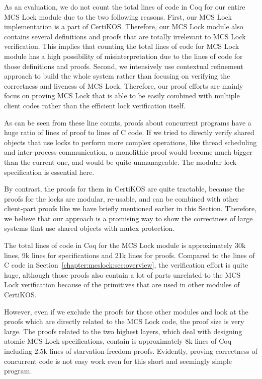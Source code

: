 As an evaluation, we do not count the total lines of code in Coq for our entire 
MCS Lock module due to the two following reasons. First, our MCS Lock implementation 
is a part of CertiKOS. Therefore, our MCS Lock module also contains several definitions 
and proofs that are totally irrelevant to MCS Lock verification. 
This implies that counting the total lines of code for MCS Lock module has a 
high possibility of misinterpretation due to the lines of code for those definitions and proofs.
Second, we intensively use contextual refinement approach to 
build the whole system rather than focusing on verifying the correctness and 
liveness of MCS Lock. Therefore, our proof efforts are mainly focus on proving 
MCS Lock that is able to be easily combined with multiple client codes 
rather than the efficient lock verification itself.  

As can be seen from these line counts, proofs about concurrent programs
have a huge ratio of lines of proof to lines of C code.
If we tried to directly verify shared objects that use locks to 
perform more complex operations, like thread scheduling
and inter-process communication, a monolithic proof  
would become much bigger than the current one, and would be quite
unmanageable. The modular lock specification is essential here.


By contrast, the proofs for them in CertiKOS are quite tractable, 
because the proofs for the locks are modular, re-usable, and can 
be combined with other client-part proofs like we have briefly 
mentioned earlier in this Section.
Therefore, we believe that our approach is a promising way to 
show the correctness of large systems that use shared objects with mutex protection. 


The total lines of code in Coq for the MCS Lock module is approximately 30k lines, 9k lines for specifications and 21k lines for proofs.
Compared to the lines of C code in Section~\ref{chapter:mcslock:sec:overview}, the verification effort is quite huge, although
those proofs also contain a lot of parts unrelated to the MCS Lock verification because of the primitives that are used in other modules of CertiKOS.

However, even if we exclude the proofs for those other modules and look at the proofs which are directly related to the MCS Lock code, the proof size is very large.
The proofs related to the two highest layers, which deal with designing atomic MCS Lock specifications, contain is approximately 8k lines of Coq including 2.5k lines of starvation freedom proofs.
Evidently, proving correctness of concurrent code is not easy work even for this short and seemingly simple program.

